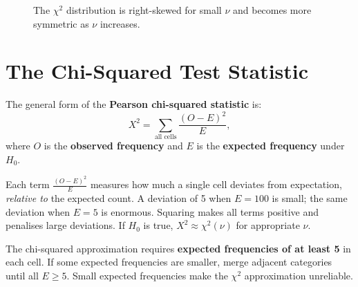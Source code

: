 \documentclass[12pt, a4paper, oneside]{book}
\theoremstyle{definition}
\theoremstyle{plain}
\theoremstyle{remark}
\begin{document}
\begin{figure}[h]
\centering
{}
\caption{The $\chi^2$ distribution is right-skewed for small $\nu$ and
  becomes more symmetric as $\nu$ increases.}
\label{fig:chisq}
\end{figure}

\section{The Chi-Squared Test Statistic}

The general form of the \textbf{Pearson chi-squared statistic} is:
\[
  X^2 = \sum_{\text{all cells}} \frac{(O-E)^2}{E},
\]
where $O$ is the \textbf{observed frequency} and $E$ is the
\textbf{expected frequency} under $H_0$.

\begin{intuition}
Each term $\frac{(O-E)^2}{E}$ measures how much a single cell deviates from
expectation, \emph{relative to} the expected count.  A deviation of 5 when
$E=100$ is small; the same deviation when $E=5$ is enormous.  Squaring makes
all terms positive and penalises large deviations.  If $H_0$ is true,
$X^2\approx\chi^2(\nu)$ for appropriate $\nu$.
\end{intuition}

\begin{warningbox}
The chi-squared approximation requires \textbf{expected frequencies of at
least 5} in each cell.  If some expected frequencies are smaller, merge
adjacent categories until all $E\ge 5$.  Small expected frequencies make
the $\chi^2$ approximation unreliable.
\end{warningbox}
\end{document}

